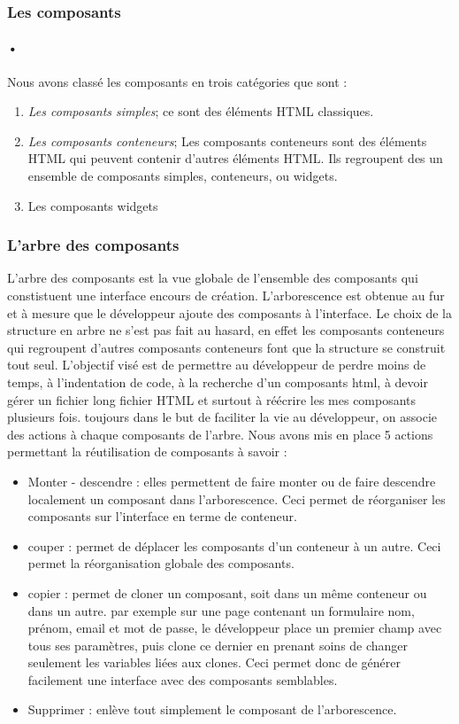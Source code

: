\documentclass[a4paper,12pt]{article}
\begin{document}
\subsubsection{ Les composants} 
\paragraph{•}
Nous avons classé les composants en trois catégories que sont :
\begin{enumerate}[label=\Alph*)]
\item \emph{ Les composants simples};
ce sont des éléments HTML classiques.
\item \emph { Les composants conteneurs};
Les composants conteneurs sont des éléments HTML qui peuvent contenir d'autres éléments HTML. 
Ils regroupent des un ensemble de composants simples, conteneurs, ou widgets. 
\item Les composants widgets
\end{enumerate}



\subsubsection{ L'arbre des composants}
 L'arbre des composants est la  vue globale de l’ensemble des
composants qui constistuent une interface  encours de création. L’arborescence est
obtenue au fur et à mesure que le développeur ajoute des composants à l'interface. Le choix de la structure en arbre ne s'est pas 
fait au hasard, en effet les composants conteneurs qui regroupent d'autres composants conteneurs font que la structure se construit tout seul.
L'objectif visé est de permettre au développeur de perdre moins de temps, à l'indentation de code, à la recherche d'un composants html, à devoir gérer un fichier long fichier HTML et surtout à réécrire les mes composants plusieurs fois. toujours dans le but de faciliter la vie au développeur, on associe des actions à chaque composants de l'arbre.
Nous avons mis en place 5 actions permettant la réutilisation de composants à savoir :

\begin{itemize}
\item Monter - descendre : elles permettent de faire monter ou de faire descendre localement un composant dans
  l'arborescence. Ceci permet de réorganiser les composants sur l'interface en terme de conteneur.
\item couper :	 permet de déplacer les composants d'un conteneur à un autre. Ceci permet la réorganisation globale des composants.
\item copier : 	permet de cloner un composant, soit dans un même conteneur ou dans un autre.
par exemple sur une page contenant un formulaire nom, prénom, email et mot de passe, le développeur place un premier
champ avec tous ses paramètres, puis clone ce dernier en prenant soins de changer seulement les variables liées aux clones. Ceci permet donc de générer facilement  une interface avec des composants semblables.
\item Supprimer : enlève tout simplement le composant de l'arborescence.
\end{itemize}
\end{document}
